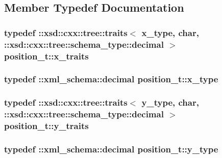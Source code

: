 \subsection{Member Typedef Documentation}
\hypertarget{classposition__t_a93173d63964948fabef843e84ddca444}{
\subsubsection[{x\-\_\-traits}]{\setlength{\rightskip}{0pt plus 5cm}typedef \-::xsd\-::cxx\-::tree\-::traits$<$ {\bf x\-\_\-type}, char, \-::xsd\-::cxx\-::tree\-::schema\-\_\-type\-::decimal $>$ {\bf position\-\_\-t\-::x\-\_\-traits}}}\label{classposition__t_a93173d63964948fabef843e84ddca444}
\hypertarget{classposition__t_a591a4bfd8546a40bc8dfca674cb54719}{
\subsubsection[{x\-\_\-type}]{\setlength{\rightskip}{0pt plus 5cm}typedef \-::{\bf xml\-\_\-schema\-::decimal} {\bf position\-\_\-t\-::x\-\_\-type}}}\label{classposition__t_a591a4bfd8546a40bc8dfca674cb54719}
\hypertarget{classposition__t_ae9c33a2fd06ca0d9187e460c61ecb5c0}{
\subsubsection[{y\-\_\-traits}]{\setlength{\rightskip}{0pt plus 5cm}typedef \-::xsd\-::cxx\-::tree\-::traits$<$ {\bf y\-\_\-type}, char, \-::xsd\-::cxx\-::tree\-::schema\-\_\-type\-::decimal $>$ {\bf position\-\_\-t\-::y\-\_\-traits}}}\label{classposition__t_ae9c33a2fd06ca0d9187e460c61ecb5c0}
\hypertarget{classposition__t_afe9eaece61abab81f8ead82576de6175}{
\subsubsection[{y\-\_\-type}]{\setlength{\rightskip}{0pt plus 5cm}typedef \-::{\bf xml\-\_\-schema\-::decimal} {\bf position\-\_\-t\-::y\-\_\-type}}}\label{classposition__t_afe9eaece61abab81f8ead82576de6175}
